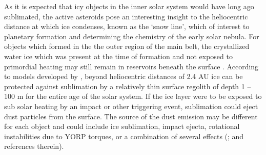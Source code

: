 \documentclass[iop,apj]{emulateapj}
\begin{document}
As it is expected that icy objects in the inner solar system would have long ago sublimated, the active asteroids pose an interesting insight to the heliocentric distance at which ice condenses, known as the `snow line', which of interest to planetary formation and determining the chemistry of the early solar nebula. For objects which formed in the the outer region of the main belt, the crystallized water ice which was present at the time of formation and not exposed to primordial heating may still remain in reservoirs beneath the surface \citep{prialnik09}.  According to models developed by \citet*{fanale89},  beyond heliocentric distances of 2.4 AU ice can be protected against sublimation by a relatively thin surface regolith  of depth 1 -- 100 m for the entire age of the solar system. If the ice layer were to be exposed to sub solar heating by an impact or other triggering event, sublimation could eject dust particles from the surface. The source of the dust emission may be different for each object and could include ice sublimation, impact ejecta, rotational instabilities due to YORP torques, or a combination of several effects (\cite{jewitt15}; and references therein).  


\end{document}
